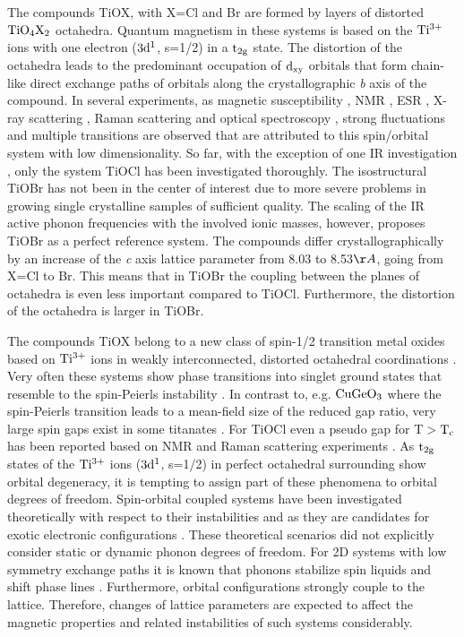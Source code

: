 \documentclass[prb,preprint,draft,amsmath,showpacs]{revtex4}
\begin{document}
The compounds TiOX, with X=Cl and Br are formed by layers of distorted $\rm TiO_4X_2$
octahedra. Quantum magnetism in these systems is based on the $\rm Ti^{3+}$ ions with
one electron ($\rm 3d^1$, s=1/2) in a $\rm t_{2g}$ state. The distortion of the
octahedra leads to the predominant occupation of $\rm d_{xy}$ orbitals that form
chain-like direct exchange paths of orbitals along the crystallographic \emph{b} axis of
the compound. In several experiments, as magnetic susceptibility
\cite{beyon93,seidel03}, NMR \cite{imai03}, ESR \cite{kataev03}, X-ray scattering
\cite{lee03,shaz04}, Raman scattering and optical spectroscopy \cite{lemmens03,caimi04},
strong fluctuations and multiple transitions are observed that are attributed to this
spin/orbital system with low dimensionality. So far, with the exception of one IR
investigation \cite{caimi04b}, only the system TiOCl has been investigated thoroughly.
The isostructural TiOBr has not been in the center of interest due to more severe
problems in growing single crystalline samples of sufficient quality. The scaling of the
IR active phonon frequencies with the involved ionic masses, however, proposes TiOBr as
a perfect reference system. The compounds differ crystallographically by an increase of
the \emph{c} axis lattice parameter from 8.03 to 8.53$\AA$, going from X=Cl to Br. This
means that in TiOBr the coupling between the planes of octahedra is even less important
compared to TiOCl. Furthermore, the distortion of the octahedra is larger in TiOBr.

The compounds TiOX belong to a new class of spin-1/2 transition metal oxides based on
$\rm Ti^{3+}$ ions in weakly interconnected, distorted octahedral coordinations
\cite{axtell97,isobe02,seidel03,isobe02b}. Very often these systems show phase
transitions into singlet ground states that resemble to the spin-Peierls instability
\cite{bray83}. In contrast to, e.g. $\rm CuGeO_3$ \cite{hase93,lemmens-rev} where the
spin-Peierls transition leads to a mean-field size of the reduced gap ratio, very large
spin gaps exist in some titanates \cite{isobe02,lemmens-millet}. For TiOCl even a pseudo
gap for T$>$$\rm T_c$ has been reported based on NMR and Raman scattering experiments
\cite{imai03,lemmens03}. As $\rm t_{2g}$ states of the $\rm Ti^{3+}$ ions ($\rm 3d^1$,
s=1/2) in perfect octahedral surrounding show orbital degeneracy, it is tempting to
assign part of these phenomena to orbital degrees of freedom. Spin-orbital coupled
systems have been investigated theoretically with respect to their instabilities
\cite{pati98,yamashita00,koleshuk01,hikihara04} and as they are candidates for exotic
electronic configurations \cite{beyon93,seidel03,hikihara04}. These theoretical
scenarios did not explicitly consider static or dynamic phonon degrees of freedom. For
2D systems with low symmetry exchange paths it is known that phonons stabilize spin
liquids and shift phase lines \cite{starykh96}. Furthermore, orbital configurations
strongly couple to the lattice\cite{valenti03}. Therefore, changes of lattice parameters
are expected to affect the magnetic properties and related instabilities of such systems
considerably.
\end{document}
